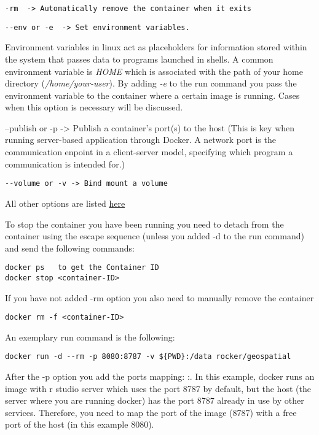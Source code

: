 \documentclass[
]{book}
\begin{document}
\begin{verbatim}
-rm  -> Automatically remove the container when it exits
\end{verbatim}

\begin{verbatim}
--env or -e  -> Set environment variables.
\end{verbatim}

Environment variables in linux act as placeholders for information stored within the system that passes data to programs launched in shells. A common environment variable is \emph{HOME} which is associated with the path of your home directory (\emph{/home/your-user}). By adding \emph{-e} to the run command you pass the environment variable to the container where a certain image is running. Cases when this option is necessary will be discussed.

--publish or -p -\textgreater{} Publish a container's port(s) to the host (This is key when running server-based application through Docker. A network port is the communication enpoint in a client-server model, specifying which program a communication is intended for.)

\begin{verbatim}
--volume or -v -> Bind mount a volume 
\end{verbatim}

All other options are listed \href{https://docs.docker.com/engine/reference/commandline/run/}{here}

To stop the container you have been running you need to detach from the container using the escape sequence (unless you added -d to the run command) and send the following commands:

\begin{verbatim}
docker ps   to get the Container ID
docker stop <container-ID>  
\end{verbatim}

If you have not added -rm option you also need to manually remove the container

\begin{verbatim}
docker rm -f <container-ID>
\end{verbatim}

An exemplary run command is the following:

\begin{verbatim}
docker run -d --rm -p 8080:8787 -v ${PWD}:/data rocker/geospatial
\end{verbatim}

After the -p option you add the ports mapping: :. In this example, docker runs an image with r studio server which uses the port 8787 by default, but the host (the server where you are running docker) has the port 8787 already in use by other services. Therefore, you need to map the port of the image (8787) with a free port of the host (in this example 8080).
\end{document}
